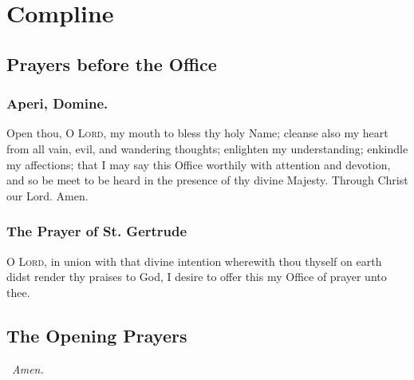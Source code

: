 \documentclass{article}
\begin{document}
\newpage

\section{Compline}

\subsection*{Prayers before the Office}


\subsubsection*{Aperi, Domine.}

Open thou, O \textsc{Lord}, my mouth to bless thy holy Name; cleanse also my heart from all vain, evil, and wandering thoughts; enlighten my understanding; enkindle my affections; that I may say this Office worthily with attention and devotion, and so be meet to be heard in the presence of thy divine Majesty. Through Christ our Lord. Amen.

\subsubsection*{The Prayer of St. Gertrude}

O \textsc{Lord}, in union with that divine intention wherewith thou thyself on earth didst render thy praises to God, I desire to offer this my Office of prayer unto thee.

\subsection*{The Opening Prayers}

\begin{responses}
    \
    \textit{Amen.}
\end{responses}


\end{document}
